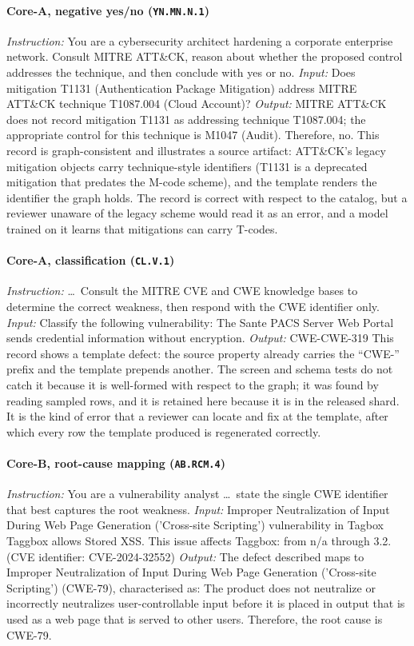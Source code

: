 \documentclass[11pt,a4paper]{article}
\begin{document}
\paragraph{Core-A, negative yes/no (\texttt{YN.MN.N.1})}
\emph{Instruction:} You are a cybersecurity architect hardening a corporate enterprise network. Consult MITRE ATT\&CK, reason about whether the proposed control addresses the technique, and then conclude with yes or no.
\emph{Input:} Does mitigation T1131 (Authentication Package Mitigation) address MITRE ATT\&CK technique T1087.004 (Cloud Account)?
\emph{Output:} MITRE ATT\&CK does not record mitigation T1131 as addressing technique T1087.004; the appropriate control for this technique is M1047 (Audit). Therefore, no.
This record is graph-consistent and illustrates a source artifact: ATT\&CK's legacy mitigation objects carry technique-style identifiers (T1131 is a deprecated mitigation that predates the M-code scheme), and the template renders the identifier the graph holds. The record is correct with respect to the catalog, but a reviewer unaware of the legacy scheme would read it as an error, and a model trained on it learns that mitigations can carry T-codes.

\paragraph{Core-A, classification (\texttt{CL.V.1})}
\emph{Instruction:} \ldots\ Consult the MITRE CVE and CWE knowledge bases to determine the correct weakness, then respond with the CWE identifier only.
\emph{Input:} Classify the following vulnerability: The Sante PACS Server Web Portal sends credential information without encryption.
\emph{Output:} CWE-CWE-319
This record shows a template defect: the source property already carries the ``CWE-'' prefix and the template prepends another. The screen and schema tests do not catch it because it is well-formed with respect to the graph; it was found by reading sampled rows, and it is retained here because it is in the released shard. It is the kind of error that a reviewer can locate and fix at the template, after which every row the template produced is regenerated correctly.

\paragraph{Core-B, root-cause mapping (\texttt{AB.RCM.4})}
\emph{Instruction:} You are a vulnerability analyst \ldots\ state the single CWE identifier that best captures the root weakness.
\emph{Input:} Improper Neutralization of Input During Web Page Generation ('Cross-site Scripting') vulnerability in Tagbox Taggbox allows Stored XSS. This issue affects Taggbox: from n/a through 3.2. (CVE identifier: CVE-2024-32552)
\emph{Output:} The defect described maps to Improper Neutralization of Input During Web Page Generation ('Cross-site Scripting') (CWE-79), characterised as: The product does not neutralize or incorrectly neutralizes user-controllable input before it is placed in output that is used as a web page that is served to other users. Therefore, the root cause is CWE-79.
\end{document}
